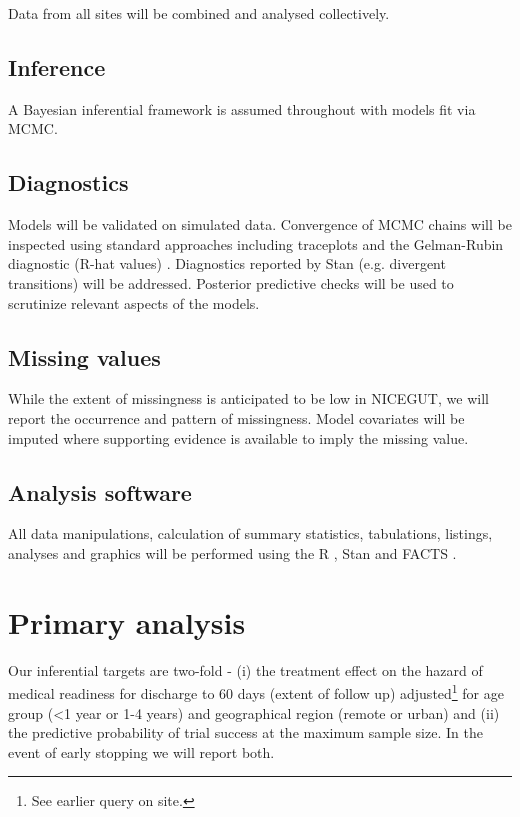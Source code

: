 \documentclass[a4paper]{article}
\begin{document}
Data from all sites will be combined and analysed collectively.

\subsection{Inference}

A Bayesian inferential framework is assumed throughout with models fit via MCMC.

\subsection{Diagnostics}

Models will be validated on simulated data.
Convergence of MCMC chains will be inspected using standard approaches including traceplots and the Gelman-Rubin diagnostic (R-hat values) \cite{gelman_rubin_1992}.
Diagnostics reported by Stan (e.g. divergent transitions) will be addressed. 
Posterior predictive checks will be used to scrutinize relevant aspects of the models.

\subsection{Missing values}

While the extent of missingness is anticipated to be low in NICEGUT, we will report the occurrence and pattern of missingness.
Model covariates will be imputed where supporting evidence is available to imply the missing value.

\subsection{Analysis software}

All data manipulations, calculation of summary statistics, tabulations, listings, analyses and graphics will be performed using the R \cite{R}, Stan \cite{Carpenter2017, RStan} and FACTS \cite{facts}.

\section{Primary analysis}

Our inferential targets are two-fold - (i) the treatment effect on the hazard of medical readiness for discharge to 60 days (extent of follow up) adjusted\footnote{See earlier query on site.} for age group (<1 year or 1-4 years) and geographical region (remote or urban) and (ii) the predictive probability of trial success at the maximum sample size.
In the event of early stopping we will report both.
\end{document}
